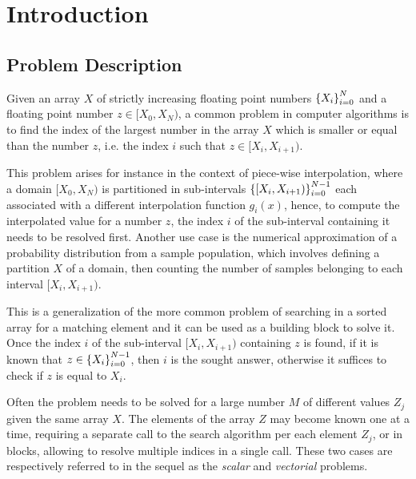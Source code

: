 \documentclass[preprint,1p,times]{elsarticle}
\begin{document}
\section{Introduction}
\label{sec:introduction}

\subsection{Problem Description}

Given an array $X$ of strictly increasing floating point numbers $\left \{ X_i \right \}_{i=0}^{N}$  
and a floating point number $z \in [X_0,X_N)$,
a common problem in computer algorithms is to find the index of the largest number in the array $X$ which is smaller or equal than the number $z$, i.e. the index $i$ such that $z \in [X_i,X_{i+1})$.

This problem arises for instance in the context of piece-wise interpolation, where a domain $[X_0,X_N)$ 
is partitioned in sub-intervals $\left \{ [X_{i},X_{i+1}) \right \}_{i=0}^{N-1}$ each associated with a different interpolation function $g_i(x)$, hence, to compute the interpolated value for a number
$z$, the index $i$ of the sub-interval containing it needs to be resolved first.
Another use case is the numerical approximation of a probability distribution from a sample population, which involves defining a partition $X$ of a domain, then counting the number of samples belonging to each interval $[X_i,X_{i+1})$.

This is a generalization of the more common problem of searching in a sorted array for a matching element and it can be used as a building block to solve it. Once the index $i$ of the sub-interval $[X_i,X_{i+1})$ containing $z$ is found, if it is known that $z \in \left \{ X_i \right \}_{i=0}^{N-1}$, then $i$ is the sought answer, otherwise it suffices to check if $z$ is equal to $X_i$. 

Often the problem needs to be solved for a large number $M$ of different values $Z_j$ given the same array $X$.
The elements of the array $Z$ may become known one at a time, requiring a separate call to the search algorithm per each element $Z_j$, or in blocks, allowing to resolve multiple indices in a single call. These two  cases are respectively referred to in the sequel as the \textit{scalar} and \textit{vectorial} problems.
\end{document}
